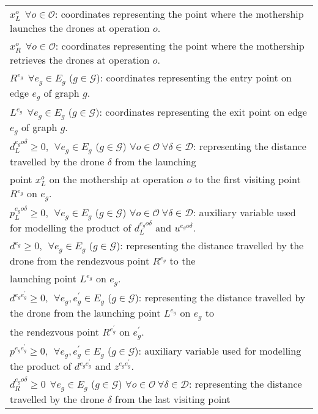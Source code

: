 \begin{table}[h!]
\begin{tabular}{|l|}
$x_L^o \:\: \forall o \in \mathcal O$: coordinates representing the point where the mothership launches the drones at operation $o$.\\
$x_R^o \:\: \forall o \in \mathcal O$: coordinates representing the point where the mothership retrieves the drones at operation $o$.\\
$R^{e_g} \:\: \forall e_g \in E_g$ ($g \in \mathcal{G}$): coordinates representing the entry point on edge $e_g$ of graph $g$.\\
$L^{e_g} \:\: \forall e_g \in E_g$ ($g \in \mathcal{G})$: coordinates representing the exit point on edge $e_g$ of graph $g$.\\
$d_L^{e_go\delta} \geq 0, \:\: \forall e_g \in E_g$ ($g \in \mathcal{G}$) $\forall o \in \mathcal O \:\forall \delta\in\mathcal D$: representing the distance travelled by the drone $\delta$ from the launching\\
\hspace*{1cm} point $x_L^o$ on the mothership at operation $o$ to the first visiting point $R^{e_g}$ on $e_g$.\\
$p_L^{e_go\delta} \geq 0, \:\: \forall e_g \in E_g$ ($g \in \mathcal{G}$) $\forall o \in \mathcal O \:\forall \delta\in\mathcal D$: auxiliary variable used for modelling the product of $d_L^{e_go\delta}$ and $u^{e_go\delta}$.\\
$d^{e_g} \geq 0, \:\: \forall e_g \in E_g$ ($g \in \mathcal{G}$): representing the distance travelled by the drone from the rendezvous point $R^{e_g}$ to the \\
\hspace*{1cm} launching point $L^{e_g}$ on $e_g$. \\
$d^{e_ge^\prime_g} \geq 0, \:\: \forall e_g, e^\prime_g \in E_g $ ($g \in \mathcal{G}$): representing the distance travelled by the drone from the launching point $L^{e_g}$ on $e_g$ to\\
\hspace*{1cm}  the rendezvous point $R^{e^\prime_g}$ on $e^\prime_g$.\\
$p^{e_ge^\prime_g} \geq 0, \:\: \forall e_g, e^\prime_g \in E_g $ ($g \in \mathcal{G}$): auxiliary variable used for modelling the product of $d^{e_ge^\prime_g}$ and $z^{e_ge^\prime_g}$.\\
$d_R^{e_go\delta} \geq 0 \:\: \forall e_g \in E_g$ ($g \in \mathcal{G}$) $\forall o \in \mathcal O \:\forall \delta\in\mathcal D$: representing the distance travelled by the drone $\delta$ from the last visiting point\\

\end{tabular}
\end{table}
